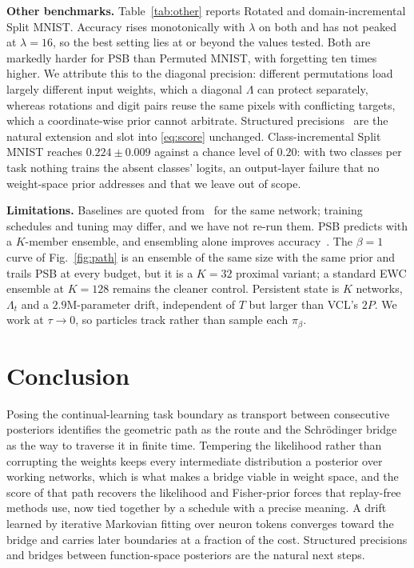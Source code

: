 \documentclass{article}
\begin{document}
\textbf{Other benchmarks.} Table~\ref{tab:other} reports Rotated and
domain-incremental Split MNIST. Accuracy rises monotonically with $\lambda$ on
both and has not peaked at $\lambda=16$, so the best setting lies at or beyond
the values tested. Both are markedly harder for PSB than Permuted MNIST, with
forgetting ten times higher. We attribute this to the diagonal precision:
different permutations load largely different input weights, which a diagonal
$\Lambda$ can protect separately, whereas rotations and digit pairs reuse the
same pixels with conflicting targets, which a coordinate-wise prior cannot
arbitrate. Structured precisions~\cite{ritter2018laplace} are the natural
extension and slot into \eqref{eq:score} unchanged. Class-incremental Split
MNIST reaches $0.224\pm0.009$ against a chance level of $0.20$: with two
classes per task nothing trains the absent classes' logits, an output-layer
failure that no weight-space prior addresses and that we leave out of scope.

\textbf{Limitations.} Baselines are quoted from~\cite{nguyen2018vcl} for the
same network; training schedules and tuning may differ, and we have not re-run
them. PSB predicts with a $K$-member ensemble, and ensembling alone improves
accuracy~\cite{lakshminarayanan2017ensembles}. The $\beta{=}1$ curve of
Fig.~\ref{fig:path} is an ensemble of the same size with the same prior and
trails PSB at every budget, but it is a $K=32$ proximal variant; a standard EWC
ensemble at $K=128$ remains the cleaner control. Persistent state is $K$
networks, $\Lambda_t$ and a $2.9$M-parameter drift, independent of $T$ but
larger than VCL's $2P$. We work at $\tau\to0$, so particles track rather than
sample each $\pi_\beta$.

\section{Conclusion}
\label{sec:conclusion}

Posing the continual-learning task boundary as transport between consecutive
posteriors identifies the geometric path as the route and the Schr\"odinger
bridge as the way to traverse it in finite time. Tempering the likelihood rather
than corrupting the weights keeps every intermediate distribution a posterior
over working networks, which is what makes a bridge viable in weight space, and
the score of that path recovers the likelihood and Fisher-prior forces that
replay-free methods use, now tied together by a schedule with a precise meaning.
A drift learned by iterative Markovian fitting over neuron tokens converges
toward the bridge and carries later boundaries at a fraction of the cost.
Structured precisions and bridges between function-space posteriors are the
natural next steps.

\vfill\pagebreak


\end{document}
